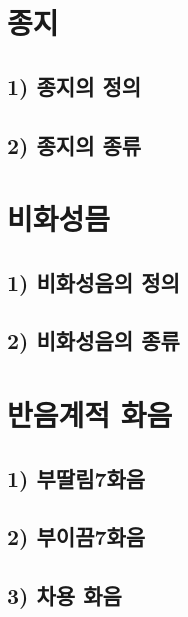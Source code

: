 \documentclass[12pt, a4paper, oneside]{book}
\let\stdsection\section
\renewcommand\section{\newpage\stdsection}
\begin{document}
%
	\section{종지}

	\subsection{1) 종지의 정의}

	\subsection{2) 종지의 종류}

%
	\section{비화성믐}

	\subsection{1) 비화성음의 정의}

	\subsection{2) 비화성음의 종류}



%
	\section{반음계적 화음}

	\subsection{1) 부딸림7화음}

	\subsection{2) 부이끔7화음}

	\subsection{3) 차용 화음}
\end{document}
